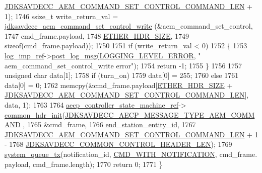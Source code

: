 \begin{DoxyCode}
      \hyperlink{group__command__set__control_ga500832fc15eb493007a81a9d07ab06e5}{JDKSAVDECC\_AEM\_COMMAND\_SET\_CONTROL\_COMMAND\_LEN} + 1);
1746     ssize\_t write\_return\_val = \hyperlink{group__command__set__control_ga0b8a1dcd8867aa3cf2d0f68f300a4f65}{jdksavdecc\_aem\_command\_set\_control\_write}
      (&aem\_command\_set\_control,
1747                                                                         cmd\_frame.payload,
1748                                                                         
      \hyperlink{namespaceavdecc__lib_a6c827b1a0d973e18119c5e3da518e65ca9512ad9b34302ba7048d88197e0a2dc0}{ETHER\_HDR\_SIZE},
1749                                                                         \textcolor{keyword}{sizeof}(cmd\_frame.payload));
1750 
1751     \textcolor{keywordflow}{if} (write\_return\_val < 0)
1752     \{
1753         \hyperlink{namespaceavdecc__lib_acbe3e2a96ae6524943ca532c87a28529}{log\_imp\_ref}->\hyperlink{classavdecc__lib_1_1log_a68139a6297697e4ccebf36ccfd02e44a}{post\_log\_msg}(\hyperlink{namespaceavdecc__lib_a501055c431e6872ef46f252ad13f85cdaf2c4481208273451a6f5c7bb9770ec8a}{LOGGING\_LEVEL\_ERROR}, \textcolor{stringliteral}{"
      aem\_command\_set\_control\_write error"});
1754         \textcolor{keywordflow}{return} -1;
1755     \}
1756 
1757     \textcolor{keywordtype}{unsigned} \textcolor{keywordtype}{char} data[1];
1758     \textcolor{keywordflow}{if} (turn\_on)
1759         data[0] = 255;
1760     \textcolor{keywordflow}{else}
1761         data[0] = 0;
1762     memcpy(&cmd\_frame.payload[\hyperlink{namespaceavdecc__lib_a6c827b1a0d973e18119c5e3da518e65ca9512ad9b34302ba7048d88197e0a2dc0}{ETHER\_HDR\_SIZE} + 
      \hyperlink{group__command__set__control_ga500832fc15eb493007a81a9d07ab06e5}{JDKSAVDECC\_AEM\_COMMAND\_SET\_CONTROL\_COMMAND\_LEN}], data, 1);
1763 
1764     \hyperlink{namespaceavdecc__lib_a0b1b5aea3c0490f77cbfd9178af5be22}{aecp\_controller\_state\_machine\_ref}->
      \hyperlink{classavdecc__lib_1_1aecp__controller__state__machine_aafc737d7ed17a62fed9df6528f18d3ec}{common\_hdr\_init}(\hyperlink{group__aecp__message__type_ga4625ce189cc209f42deb0629f48faf69}{JDKSAVDECC\_AECP\_MESSAGE\_TYPE\_AEM\_COMMAND}
      ,
1765                                                        &cmd\_frame,
1766                                                        \hyperlink{classavdecc__lib_1_1end__station__imp_ac32ac278fb799e1b4f0cd539e0abe2b5}{end\_station\_entity\_id},
1767                                                        
      \hyperlink{group__command__set__control_ga500832fc15eb493007a81a9d07ab06e5}{JDKSAVDECC\_AEM\_COMMAND\_SET\_CONTROL\_COMMAND\_LEN} + 1 -
1768                                                            
      \hyperlink{group__jdksavdecc__avtp__common__control__header_gaae84052886fb1bb42f3bc5f85b741dff}{JDKSAVDECC\_COMMON\_CONTROL\_HEADER\_LEN});
1769     \hyperlink{namespaceavdecc__lib_a6dd511685627c0865a3442b539a4e8e9}{system\_queue\_tx}(notification\_id, \hyperlink{namespaceavdecc__lib_aabcadff06aa62be0ce47bc0646823604aba48b8a017e06fb240b650cdea965178}{CMD\_WITH\_NOTIFICATION}, cmd\_frame.
      payload, cmd\_frame.length);
1770     \textcolor{keywordflow}{return} 0;
1771 \}
\end{DoxyCode}


